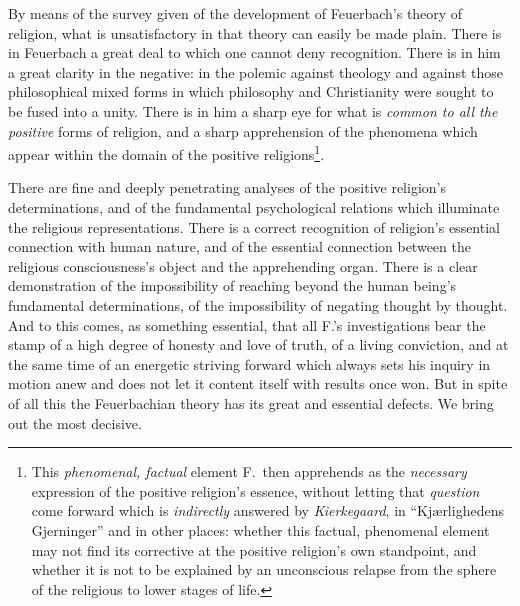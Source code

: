 \documentclass[12pt,a4paper]{book}
\begin{document}
By means of the survey given of the development of Feuerbach's theory of
religion, what is unsatisfactory in that theory can easily be made plain.
There is in Feuerbach a great deal to which one cannot deny recognition. There
is in him a great clarity in the negative: in the polemic against theology and
against those philosophical mixed forms in which philosophy and Christianity
were sought to be fused into a unity. There is in him a sharp eye for what is
\emph{common to all the positive} forms of religion, and a sharp apprehension
of the phenomena which appear within the domain of the positive
religions\footnote{This \emph{phenomenal, factual} element F.\ then apprehends
as the \emph{necessary} expression of the positive religion's essence, without
letting that \emph{question} come forward which is \emph{indirectly} answered
by \emph{Kierkegaard}, in ``Kjærlighedens Gjerninger'' and in other places:
whether this factual, phenomenal element may not find its corrective at the
positive religion's own standpoint, and whether it is not to be explained by
an unconscious relapse from the sphere of the religious to lower stages of
life.}.

There are fine and deeply penetrating analyses of the positive religion's
determinations, and of the fundamental psychological relations which
illuminate the religious representations. There is a correct recognition of
religion's essential connection with human nature, and of the essential
connection between the religious consciousness's object and the apprehending
organ. There is a clear demonstration of the impossibility of reaching beyond
the human being's fundamental determinations, of the impossibility of negating
thought by thought. And to this comes, as something essential, that all F.'s
investigations bear the stamp of a high degree of honesty and love of truth,
of a living conviction, and at the same time of an energetic striving forward
which always sets his inquiry in motion anew and does not let it content
itself with results once won. But in spite of all this the Feuerbachian theory
has its great and essential defects. We bring out the most decisive.
\end{document}
